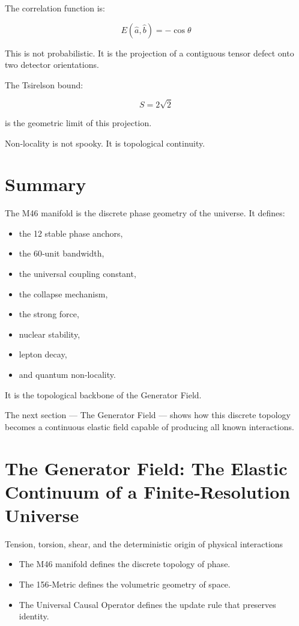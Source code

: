 \documentclass[reprint,amsmath,amssymb,aps,prl,floatfix]{revtex4-2}
\begin{document}
\begin{itemize}
The correlation function is:

\[
E(\hat{a}, \hat{b}) = -\cos\theta
\]
\medskip

This is not probabilistic.  
It is the projection of a contiguous tensor defect onto two detector orientations.
\medskip

The Tsirelson bound:

\[
S = 2\sqrt{2}
\]

is the geometric limit of this projection.
\medskip

Non‑locality is not spooky.  
It is topological continuity.

\section{Summary}

The M46 manifold is the discrete phase geometry of the universe.  
It defines:
\begin{itemize}
\item the 12 stable phase anchors,  
\item the 60‑unit bandwidth,  
\item the universal coupling constant,  
\item the collapse mechanism,  
\item the strong force,  
\item nuclear stability,  
\item lepton decay,  
\item and quantum non‑locality.
\end{itemize}
\medskip

It is the topological backbone of the Generator Field.

The next section — The Generator Field — shows how this discrete topology becomes a continuous elastic field capable of producing all known interactions.

\section{The Generator Field: The Elastic Continuum of a Finite‑Resolution Universe}

Tension, torsion, shear, and the deterministic origin of physical interactions
\medskip
\begin{itemize}
\item The M46 manifold defines the discrete topology of phase.  
\item The 156‑Metric defines the volumetric geometry of space.  
\item The Universal Causal Operator defines the update rule that preserves identity.
\end{itemize}
\medskip


\end{itemize}
\end{document}
